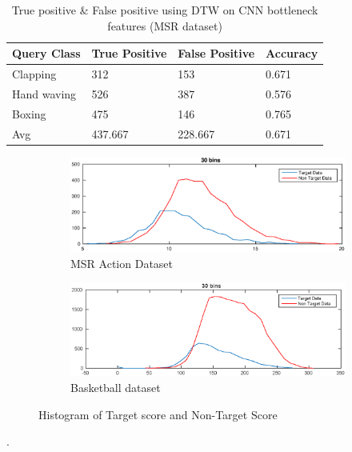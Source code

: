 \begin{table}[ht]
\caption[Event classification using DTW on CNN bottleneck features (MSR Action dataset \RN{2}) ]{True positive \& False positive using DTW on CNN bottleneck features (MSR dataset)}
\label{table:cnn_dtw_res_msr}
\centering
\begin{tabular}{|l|l|l|l|}
\hline
Query Class & True Positive & False Positive & Accuracy \\ \hline
Clapping    &312	&153	&0.671\\
Hand waving &526	&387	&0.576\\
Boxing      &475	&146	&0.765\\
\hline
Avg	&437.667	&228.667	&0.671\\
\hline  
\end{tabular}
\end{table} 
\pagebreak
\begin{figure}[ht]
        \centering
        \begin{subfigure}[b]{0.9\textwidth}
        		\centering
        		\includegraphics[width=\textwidth]{./imgs/MSR_DTW.eps}
        		\caption{MSR Action Dataset}
        \end{subfigure}
        
        \begin{subfigure}[b]{0.9\textwidth}
        			\centering
                \includegraphics[width=\textwidth]{./imgs/Basket_DTW.eps}
                \caption{Basketball dataset}
        \end{subfigure}
        \caption{ Histogram of Target score and Non-Target Score}
        \label{fig:dtw_score}
\end{figure}.

